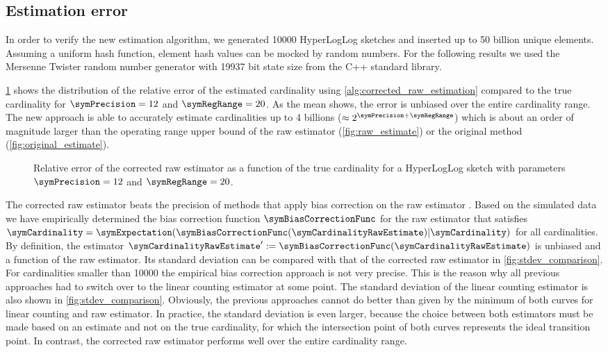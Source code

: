 \documentclass[a4paper]{scrartcl}
\begin{document}
\subsection{Estimation error}
\label{sec:corrected_raw_estimation_error}
In order to verify the new estimation algorithm, we generated \num{10000} HyperLogLog sketches and inserted up to 50 billion unique elements. Assuming a uniform hash function, element hash values can be mocked by random numbers. For the following results we used the Mersenne Twister random number generator with \num{19937} bit state size from the C++ standard library.

\cref{fig:raw_corrected_estimation_error_12_20} shows the distribution of the relative error of the estimated cardinality using \cref{alg:corrected_raw_estimation} compared to the true cardinality for $\symPrecision=12$ and $\symRegRange=20$. As the mean shows, the error is unbiased over the entire cardinality range. The new approach is able to accurately estimate cardinalities up to 4 billions ($\approx 2^{\symPrecision+\symRegRange}$) which is about an order of magnitude larger than the operating range upper bound of the raw estimator (\cref{fig:raw_estimate}) or the original method (\cref{fig:original_estimate}).

\begin{figure}
\centering

\caption{Relative error of the corrected raw estimator as a function of the true cardinality for a HyperLogLog sketch with parameters $\symPrecision = 12$ and $\symRegRange=20$.}
\label{fig:raw_corrected_estimation_error_12_20}
\end{figure}

The corrected raw estimator beats the precision of methods that apply bias correction on the raw estimator \cite{Heule2013,Rhodes2015,Sanfilippo2014}.
Based on the simulated data we have empirically determined the bias correction function $\symBiasCorrectionFunc$ for the raw estimator that satisfies $\symCardinality = \symExpectation(\symBiasCorrectionFunc(\symCardinalityRawEstimate)\vert\symCardinality)$ for all cardinalities. By definition, 
the estimator $\symCardinalityRawEstimate':=\symBiasCorrectionFunc(\symCardinalityRawEstimate)$ is unbiased and a function of the raw estimator. Its standard deviation can be compared with that of the corrected raw estimator in \cref{fig:stdev_comparison}. For cardinalities smaller than \num{10000} the empirical bias correction approach is not very precise. This is the reason why all previous approaches had to switch over to the linear counting estimator at some point. The standard deviation of the linear counting estimator is also shown in \cref{fig:stdev_comparison}. Obviously, the previous approaches cannot do better than given by the minimum of both curves for linear counting and raw estimator. In practice, the standard deviation is even larger, because the choice between both estimators must be made based on an estimate and not on the true cardinality, for which the intersection point of both curves represents the ideal transition point. In contrast, the corrected raw estimator performs well over the entire cardinality range.
\end{document}
